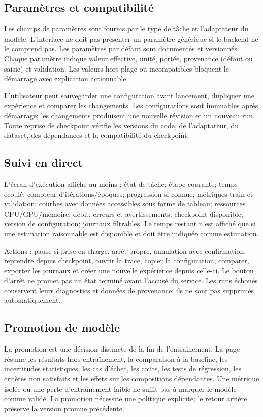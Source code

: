 \documentclass[11pt,a4paper]{article}
\begin{document}
\subsection{Paramètres et compatibilité}
Les champs de paramètres sont fournis par le type de tâche et l'adaptateur du modèle. L'interface ne doit pas présenter un paramètre générique si le backend ne le comprend pas. Les paramètres par défaut sont documentés et versionnés. Chaque paramètre indique valeur effective, unité, portée, provenance (défaut ou saisie) et validation. Les valeurs hors plage ou incompatibles bloquent le démarrage avec explication actionnable.

L'utilisateur peut sauvegarder une configuration avant lancement, dupliquer une expérience et comparer les changements. Les configurations sont immuables après démarrage; les changements produisent une nouvelle révision et un nouveau run. Toute reprise de checkpoint vérifie les versions du code, de l'adaptateur, du dataset, des dépendances et la compatibilité du checkpoint.

\subsection{Suivi en direct}
L'écran d'exécution affiche au moins : état de tâche; étape courante; temps écoulé; compteur d'itérations/époques; progression si connue; métriques train et validation; courbes avec données accessibles sous forme de tableau; ressources CPU/GPU/mémoire; débit; erreurs et avertissements; checkpoint disponible; version de configuration; journaux filtrables. Le temps restant n'est affiché que si une estimation raisonnable est disponible et doit être indiquée comme estimation.

Actions : pause si prise en charge, arrêt propre, annulation avec confirmation, reprendre depuis checkpoint, ouvrir la trace, copier la configuration, comparer, exporter les journaux et créer une nouvelle expérience depuis celle-ci. Le bouton d'arrêt ne promet pas un état terminé avant l'accusé du service. Les runs échoués conservent leurs diagnostics et données de provenance; ils ne sont pas supprimés automatiquement.

\subsection{Promotion de modèle}
La promotion est une décision distincte de la fin de l'entraînement. La page résume les résultats hors entraînement, la comparaison à la baseline, les incertitudes statistiques, les cas d'échec, les coûts, les tests de régression, les critères non satisfaits et les effets sur les compositions dépendantes. Une métrique isolée ou une perte d'entraînement faible ne suffit pas à marquer le modèle comme validé. La promotion nécessite une politique explicite; le retour arrière préserve la version promue précédente.
\end{document}
